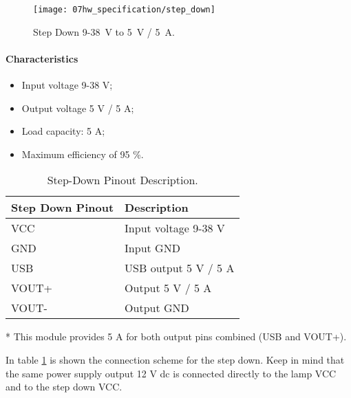 \begin{figure}[H]
	\centering
	\texttt{[image: 07hw\_specification/step\_down]}
	\caption{Step Down 9-38~V to 5~V / 5~A.}
	\label{fig:step_down}
\end{figure}

\paragraph*{Characteristics}
\begin{itemize}
	\item Input voltage 9-38 V;
	\item Output voltage 5 V / 5 A;
	\item Load capacity: 5 A;
	\item Maximum efficiency of 95 \%.
\end{itemize}

\begin{table}[H]
	\centering
	\begin{threeparttable}
	\begin{tabular}{|m{5cm}|m{6cm}|}
		\hline
		\textbf{Step Down Pinout} & \textbf{Description}
		\\\hline\hline
		
		VCC & Input voltage 9-38 V
		\\\hline
		GND & Input GND
		\\\hline
		USB & USB output 5 V / 5 A \tnote{*}
		\\\hline
		VOUT+ & Output 5 V / 5 A \tnote{*}
		\\\hline
		VOUT- & Output GND
		\\\hline
	\end{tabular}
	
	\begin{tablenotes}
		\small
		\item[*] This module provides 5 A for both output pins combined (USB and VOUT+).
	\end{tablenotes}
	\end{threeparttable}
	\caption{Step-Down Pinout Description.}
	\label{table:step_down_pinout}
\end{table}

In table \ref{table:step_down_pinout} is shown the connection scheme for the step down. Keep in mind that the same power supply output 12 V \ac{dc} is connected directly to the lamp VCC and to the step down VCC.

